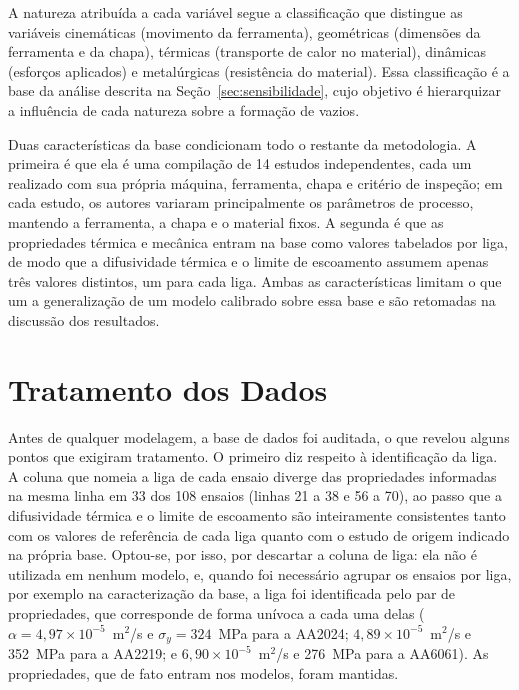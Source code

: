 \documentclass[12pt,openany]{report}
\begin{document}
A natureza atribuída a cada variável segue a classificação que distingue as variáveis cinemáticas (movimento da ferramenta), geométricas (dimensões da ferramenta e da chapa), térmicas (transporte de calor no material), dinâmicas (esforços aplicados) e metalúrgicas (resistência do material). Essa classificação é a base da análise descrita na Seção~\ref{sec:sensibilidade}, cujo objetivo é hierarquizar a influência de cada natureza sobre a formação de vazios.

Duas características da base condicionam todo o restante da metodologia. A primeira é que ela é uma compilação de 14 estudos independentes, cada um realizado com sua própria máquina, ferramenta, chapa e critério de inspeção; em cada estudo, os autores variaram principalmente os parâmetros de processo, mantendo a ferramenta, a chapa e o material fixos. A segunda é que as propriedades térmica e mecânica entram na base como valores tabelados por liga, de modo que a difusividade térmica e o limite de escoamento assumem apenas três valores distintos, um para cada liga. Ambas as características limitam o que um a generalização de um modelo calibrado sobre essa base e são retomadas na discussão dos resultados.

\section{Tratamento dos Dados}
\label{sec:tratamento}

Antes de qualquer modelagem, a base de dados foi auditada, o que revelou alguns pontos que exigiram tratamento. O primeiro diz respeito à identificação da liga. A coluna que nomeia a liga de cada ensaio diverge das propriedades informadas na mesma linha em 33 dos 108 ensaios (linhas 21 a 38 e 56 a 70), ao passo que a difusividade térmica e o limite de escoamento são inteiramente consistentes tanto com os valores de referência de cada liga quanto com o estudo de origem indicado na própria base. Optou-se, por isso, por descartar a coluna de liga: ela não é utilizada em nenhum modelo, e, quando foi necessário agrupar os ensaios por liga, por exemplo na caracterização da base, a liga foi identificada pelo par de propriedades, que corresponde de forma unívoca a cada uma delas ($\alpha = 4{,}97\times10^{-5}$~m$^2$/s e $\sigma_y = 324$~MPa para a AA2024; $4{,}89\times10^{-5}$~m$^2$/s e 352~MPa para a AA2219; e $6{,}90\times10^{-5}$~m$^2$/s e 276~MPa para a AA6061). As propriedades, que de fato entram nos modelos, foram mantidas.
\end{document}
